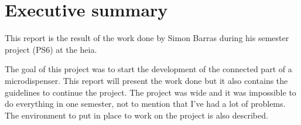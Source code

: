 \chapter{Executive summary}
\label{ch:report-executive-summary}

This report is the result of the work done by Simon Barras during his semester project (PS6) at the \acrshort{heia}.

The goal of this project was to start the development of the connected part of a microdispenser.
This report will present the work done but it also contains the guidelines to continue the project.
The project was wide and it was impossible to do everything in one semester, not to mention that I've had a lot of problems.
The environment to put in place to work on the project is also described.
